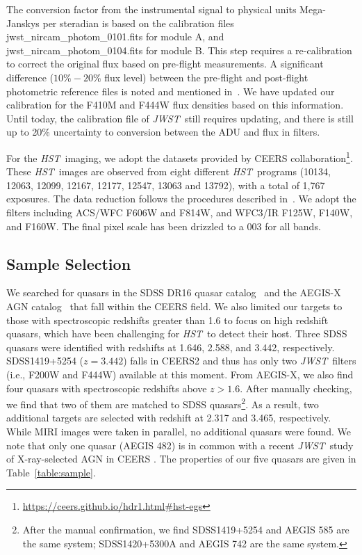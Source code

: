 \documentclass[twocolumn]{aastex631}
\newcommand{\hst}{{\it HST}}
\newcommand{\jwst}{{\it JWST}}
\begin{document}
The conversion factor from the instrumental signal to physical units Mega-Janskys per steradian is based on the calibration files \textsf{jwst\_nircam\_photom\_0101.fits} for module A, and \textsf{jwst\_nircam\_photom\_0104.fits} for module B. This step requires a re-calibration to correct the original flux based on pre-flight measurements. A significant difference ($10\%-20\%$ flux level) between the pre-flight and post-flight photometric reference files is noted and mentioned in~\citet{Adams22}. We have updated our calibration for the F410M and F444W flux densities based on this information. Until today, the calibration file of \jwst\ still requires updating, and there is still up
to 20\% uncertainty to conversion between the ADU and flux in filters. 

For the \hst\ imaging, we adopt the datasets provided by CEERS collaboration\footnote{\url{https://ceers.github.io/hdr1.html\#hst-egs}}. These \hst\ images are observed from eight different \hst\ programs (10134, 12063, 12099, 12167, 12177, 12547, 13063 and 13792), with a total of 1,767 exposures. The data reduction follows the procedures described in~\citet{Koekemoer2011}. We adopt the filters including ACS/WFC F606W and F814W, and WFC3/IR F125W, F140W, and F160W. The final pixel scale has been drizzled to a 0\farcs{}03 for all bands.


\subsection{Sample Selection}
We searched for quasars in the SDSS DR16 quasar catalog~\citep{2020ApJS..250....8L} and the AEGIS-X AGN catalog~\citep{2009ApJS..180..102L, Nandra2015} that fall within the CEERS field. We also limited our targets to those with spectroscopic redshifts greater than 1.6 to focus on high redshift quasars, which have been challenging for \hst\ to detect their host. Three SDSS quasars were identified with redshifts at 1.646, 2.588, and 3.442, respectively. SDSS1419+5254 ($z=3.442$) falls in CEERS2 and thus has only two \jwst\ filters (i.e., F200W and F444W) available at this moment. From AEGIS-X, we also find four quasars with spectroscopic redshifts above $z>1.6$. After manually checking, we find that two of them are matched to SDSS quasars\footnote{After the manual confirmation, we find SDSS1419+5254 and AEGIS 585 are the same system;  SDSS1420+5300A and AEGIS 742 are the same system.}. As a result, two additional targets are selected with redshift at 2.317 and 3.465, respectively. While MIRI images were taken in parallel, no additional quasars were found. We note that only one quasar (AEGIS 482) is in common with a recent \jwst\ study of X-ray-selected AGN in CEERS \citep{Kocevski2022}. The properties of our five quasars are given in Table~\ref{table:sample}.
\end{document}
